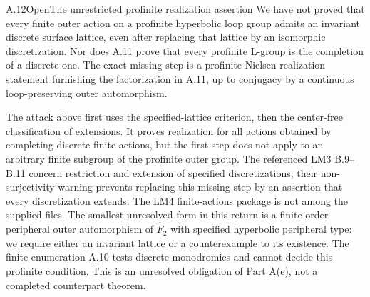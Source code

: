 \begin{statement}{A.12}{Open}{The unrestricted profinite realization assertion}
We have not proved that every finite outer action on a profinite
hyperbolic loop group admits an invariant discrete surface
lattice, even after replacing that lattice by an isomorphic
discretization. Nor does A.11 prove that every profinite
L-group is the completion of a discrete one. The exact missing
step is a profinite Nielsen realization statement furnishing
the factorization in A.11, up to conjugacy by a continuous
loop-preserving outer automorphism.
\end{statement}
The attack above first uses the specified-lattice criterion,
then the center-free classification of extensions. It proves
realization for all actions obtained by completing discrete
finite actions, but the first step does not apply to an
arbitrary finite subgroup of the profinite outer group.
The referenced LM3 B.9--B.11 concern restriction and extension
of specified discretizations; their non-surjectivity warning
prevents replacing this missing step by an assertion that
every discretization extends. The LM4 finite-actions package
is not among the supplied files. The smallest unresolved
form in this return is a finite-order peripheral outer
automorphism of $\widehat F_2$ with specified hyperbolic
peripheral type: we require either an invariant lattice or
a counterexample to its existence. The finite enumeration
A.10 tests discrete monodromies and cannot decide this
profinite condition. This is an unresolved obligation of
Part A(e), not a completed counterpart theorem.
